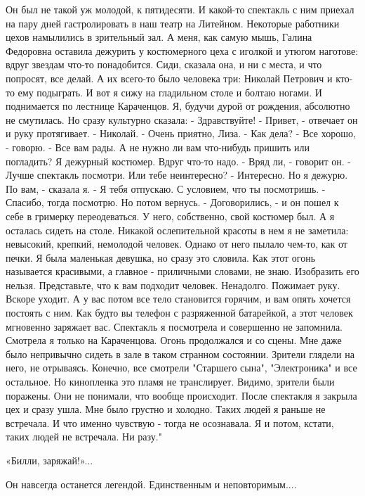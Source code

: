 \begin{itemize}
\obeycr
Он был не такой уж молодой, к пятидесяти. И какой-то спектакль с ним приехал на пару дней гастролировать в наш театр на Литейном.
Некоторые работники цехов намылились в зрительный зал. А меня, как самую мышь, Галина Федоровна оставила дежурить у костюмерного цеха с иголкой и утюгом наготове: вдруг звездам что-то понадобится. Сиди, сказала она, и ни с места, и что попросят, все делай.
А их всего-то было человека три: Николай Петрович и кто-то ему подыграть.
И вот я сижу на гладильном столе и болтаю ногами. И поднимается по лестнице Караченцов.
Я, будучи дурой от рождения, абсолютно не смутилась. Но сразу культурно сказала:
- Здравствуйте!
- Привет, - отвечает он и руку протягивает. - Николай.
- Очень приятно, Лиза.
- Как дела?
- Все хорошо, - говорю. - Все вам рады. А не нужно ли вам что-нибудь пришить или погладить? Я дежурный костюмер. Вдруг что-то надо.
- Вряд ли, - говорит он. - Лучше спектакль посмотри. Или тебе неинтересно?
- Интересно. Но я дежурю. По вам, - сказала я.
- Я тебя отпускаю. С условием, что ты посмотришь.
- Спасибо, тогда посмотрю. Но потом вернусь.
- Договорились, - и он пошел к себе в гримерку переодеваться. У него, собственно, свой костюмер был.
А я осталась сидеть на столе.
Никакой ослепительной красоты в нем я не заметила: невысокий, крепкий, немолодой человек.
Однако от него пылало чем-то, как от печки. Я была маленькая девушка, но сразу это словила.
Как этот огонь называется красивыми, а главное - приличными словами, не знаю.
Изобразить его нельзя.
Представьте, что к вам подходит человек. Ненадолго. Пожимает руку. Вскоре уходит. А у вас потом все тело становится горячим, и вам опять хочется постоять с ним. Как будто вы телефон с разряженной батарейкой, а этот человек мгновенно заряжает вас.
Спектакль я посмотрела и совершенно не запомнила.
Смотрела я только на Караченцова. Огонь продолжался и со сцены. Мне даже было непривычно сидеть в зале в таком странном состоянии.
Зрители глядели на него, не отрываясь.
Конечно, все смотрели "Старшего сына", "Электроника" и все остальное.
Но кинопленка это пламя не транслирует.
Видимо, зрители были поражены. Они не понимали, что вообще происходит.
После спектакля я закрыла цех и сразу ушла. Мне было грустно и холодно. Таких людей я раньше не встречала. И что именно чувствую - тогда не осознавала.
Я и потом, кстати, таких людей не встречала. Ни разу."
\restorecr


«Билли, заряжай!»...

Он навсегда останется легендой. Единственным и неповторимым....


\end{itemize}
